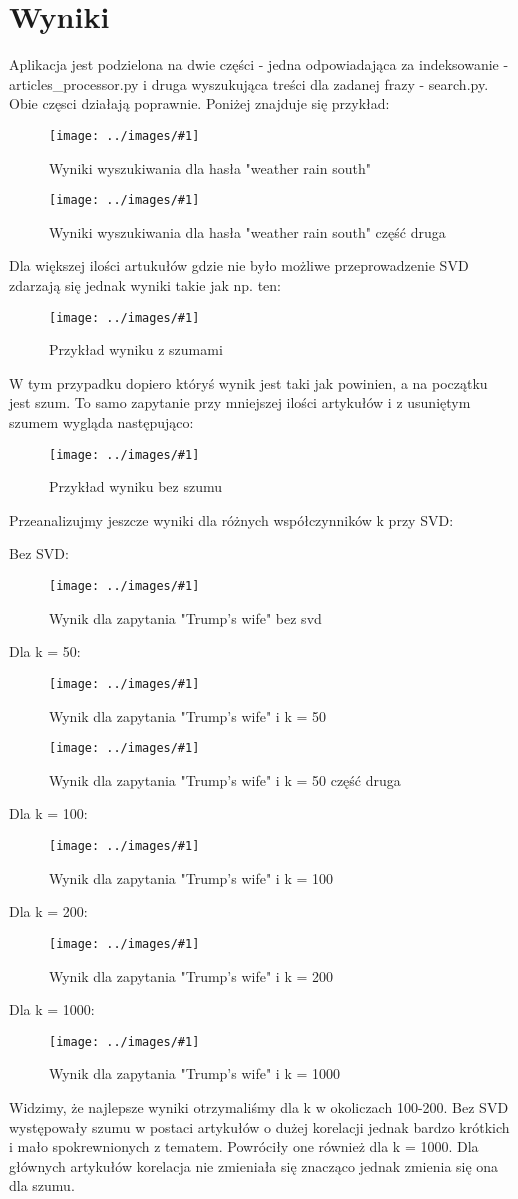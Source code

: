 \documentclass{article}
\newcommand{\image}[2]{\begin{figure}[H]
	\centering	
	\texttt{[image: ../images/\#1]}
	\caption{#2}
\end{figure}}
\begin{document}
\section{Wyniki}

Aplikacja jest podzielona na dwie części - jedna odpowiadająca za indeksowanie - articles\_processor.py i druga wyszukująca treści dla zadanej frazy  - search.py. Obie częsci działają poprawnie. Poniżej znajduje się przykład:

\image{weather_rain_south.png}{Wyniki wyszukiwania dla hasła "weather rain south"}

\image{weather_rain_south_2.png}{Wyniki wyszukiwania dla hasła "weather rain south" część druga}

Dla większej ilości artukułów gdzie nie było możliwe przeprowadzenie SVD zdarzają się jednak wyniki takie jak np. ten:

\image{baseball_fan_with_noise.png}{Przykład wyniku z szumami}

W tym przypadku dopiero któryś wynik jest taki jak powinien, a na początku jest szum. To samo zapytanie przy mniejszej ilości artykułów i z usuniętym szumem wygląda następująco:

\image{baseball_fan_without_noise.png}{Przykład wyniku bez szumu}

Przeanalizujmy jeszcze wyniki dla różnych współczynników k przy SVD:

Bez SVD:
\image{trumps_wife_no_svd.png}{Wynik dla zapytania "Trump's wife" bez svd}

Dla k = 50:
\image{trumps_wife_50.png}{Wynik dla zapytania "Trump's wife" i k = 50}
\image{trumps_wife_50_2.png}{Wynik dla zapytania "Trump's wife" i k = 50 część druga}

Dla k = 100:
\image{trumps_wife_100.png}{Wynik dla zapytania "Trump's wife" i k = 100}

Dla k = 200:
\image{trumps_wife_200.png}{Wynik dla zapytania "Trump's wife" i k = 200}

Dla k = 1000:
\image{trumps_wife_1000.png}{Wynik dla zapytania "Trump's wife" i k = 1000}

Widzimy, że najlepsze wyniki otrzymaliśmy dla k w okoliczach 100-200. Bez SVD występowały szumu w postaci artykułów o dużej korelacji jednak bardzo krótkich i mało spokrewnionych z tematem. Powróciły one również dla k = 1000. Dla głównych artykułów korelacja nie zmieniała się znacząco jednak zmienia się ona dla szumu.
\end{document}
